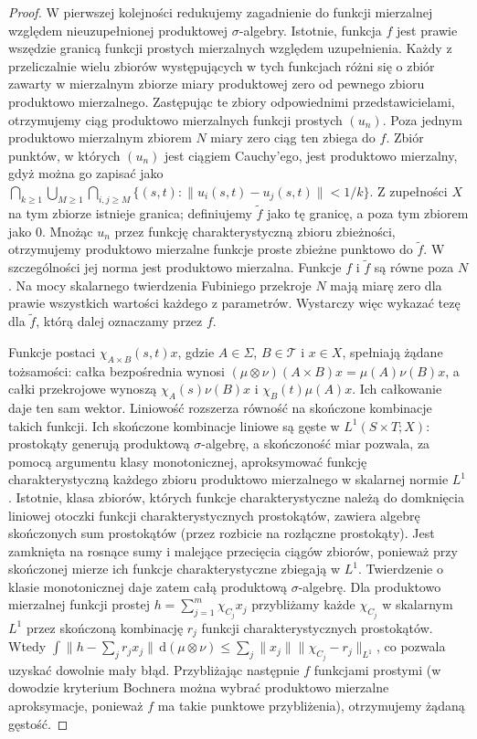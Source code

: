 \begin{proof}
W pierwszej kolejności redukujemy zagadnienie do funkcji mierzalnej
względem nieuzupełnionej produktowej $\sigma$-algebry. Istotnie,
funkcja $f$ jest prawie wszędzie granicą funkcji prostych mierzalnych
względem uzupełnienia. Każdy z przeliczalnie wielu zbiorów
występujących w tych funkcjach różni się o zbiór zawarty w mierzalnym
zbiorze miary produktowej zero od pewnego zbioru produktowo
mierzalnego. Zastępując te zbiory odpowiednimi przedstawicielami,
otrzymujemy ciąg produktowo mierzalnych funkcji prostych $(u_n)$.
Poza jednym produktowo mierzalnym zbiorem $N$ miary zero
ciąg ten zbiega do $f$. Zbiór punktów, w których $(u_n)$
jest ciągiem Cauchy'ego, jest produktowo mierzalny, gdyż
można go zapisać jako
$\bigcap_{k\ge1}\bigcup_{M\ge1}\bigcap_{i,j\ge M}
\{(s,t):\|u_i(s,t)-u_j(s,t)\|<1/k\}$.
Z zupełności $X$ na tym zbiorze istnieje granica; definiujemy
$\widetilde f$ jako tę granicę, a poza tym zbiorem jako $0$.
Mnożąc $u_n$ przez funkcję charakterystyczną zbioru zbieżności,
otrzymujemy produktowo mierzalne funkcje proste zbieżne
punktowo do $\widetilde f$. W szczególności jej norma jest
produktowo mierzalna. Funkcje $f$ i $\widetilde f$ są równe
poza $N$. Na mocy skalarnego twierdzenia Fubiniego przekroje
$N$ mają miarę zero dla prawie wszystkich wartości każdego
z parametrów. Wystarczy więc wykazać tezę dla $\widetilde f$,
którą dalej oznaczamy przez $f$.

Funkcje postaci $\chi_{A\times B}(s,t)x$, gdzie $A\in\Sigma$,
$B\in\mathcal T$ i $x\in X$, spełniają żądane tożsamości:
całka bezpośrednia wynosi $(\mu\otimes\nu)(A\times B)x
=\mu(A)\nu(B)x$, a całki przekrojowe wynoszą
$\chi_A(s)\nu(B)x$ i $\chi_B(t)\mu(A)x$. Ich całkowanie
daje ten sam wektor. Liniowość rozszerza równość na
skończone kombinacje takich funkcji.
Ich skończone kombinacje liniowe są gęste w
$L^1(S\times T;X)$: prostokąty generują produktową
$\sigma$-algebrę, a skończoność miar pozwala, za pomocą
argumentu klasy monotonicznej, aproksymować funkcję charakterystyczną
każdego zbioru produktowo mierzalnego w skalarnej normie $L^1$.
Istotnie, klasa zbiorów, których funkcje charakterystyczne należą
do domknięcia liniowej otoczki funkcji charakterystycznych prostokątów,
zawiera algebrę skończonych sum prostokątów (przez rozbicie na
rozłączne prostokąty). Jest zamknięta na rosnące sumy i malejące
przecięcia ciągów zbiorów, ponieważ przy skończonej mierze ich
funkcje charakterystyczne zbiegają w $L^1$. Twierdzenie o klasie
monotonicznej daje zatem całą produktową $\sigma$-algebrę.
Dla produktowo mierzalnej funkcji prostej
$h=\sum_{j=1}^m\chi_{C_j}x_j$ przybliżamy każde $\chi_{C_j}$
w skalarnym $L^1$ przez skończoną kombinację $r_j$ funkcji
charakterystycznych prostokątów. Wtedy
$\int\|h-\sum_j r_jx_j\|\,\mathrm d(\mu\otimes\nu)
\le\sum_j\|x_j\|\|\chi_{C_j}-r_j\|_{L^1}$, co pozwala
uzyskać dowolnie mały błąd. Przybliżając następnie
$f$ funkcjami prostymi (w dowodzie kryterium Bochnera
można wybrać produktowo mierzalne aproksymacje, ponieważ
$f$ ma takie punktowe przybliżenia), otrzymujemy
żądaną gęstość.


\end{proof}
